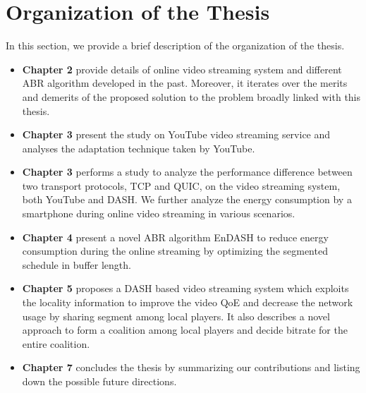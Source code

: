 \section{Organization of the Thesis}

In this section, we provide a brief description of the organization of the thesis.
\begin{itemize}
	\item {\bf Chapter 2} provide details of online video streaming system and different ABR algorithm developed in the past. Moreover, it iterates over the merits and demerits of the proposed solution to the problem broadly linked with this thesis.
	\item {\bf Chapter 3} present the study on YouTube video streaming service and analyses the adaptation technique taken by YouTube.
	\item {\bf Chapter 3} performs a study to analyze the performance difference between two transport protocols, TCP and QUIC, on the video streaming system, both YouTube and DASH. We further analyze the energy consumption by a smartphone during online video streaming in various scenarios.
	\item {\bf Chapter 4} present a novel ABR algorithm EnDASH to reduce energy consumption during the online streaming by optimizing the segmented schedule in buffer length.
	\item {\bf Chapter 5} proposes a DASH based video streaming system which exploits the locality information to improve the video QoE and decrease the network usage by sharing segment among local players. It also describes a novel approach to form a coalition among local players and decide bitrate for the entire coalition.
	\item {\bf Chapter 7} concludes the thesis by summarizing our contributions and listing down the possible future directions.
\end{itemize}
